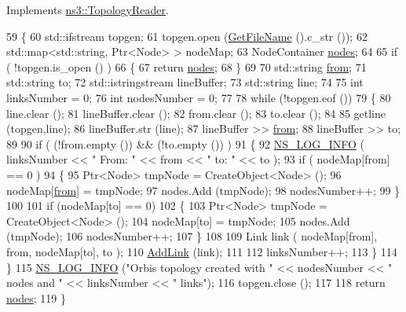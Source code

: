 Implements \hyperlink{classns3_1_1TopologyReader_ae2a69c10e0bb66d6c850a72c6655e69c}{ns3\+::\+Topology\+Reader}.


\begin{DoxyCode}
59 \{
60   std::ifstream topgen;
61   topgen.open (\hyperlink{classns3_1_1TopologyReader_a6d417b0d32aa613887596d769aee6c5d}{GetFileName} ().c\_str ());
62   std::map<std::string, Ptr<Node> > nodeMap;
63   NodeContainer \hyperlink{visualizer-ideas_8txt_a3e1b3808014a2c68ab0cd0182e041be2}{nodes};
64 
65   \textcolor{keywordflow}{if} ( !topgen.is\_open () )
66     \{
67       \textcolor{keywordflow}{return} \hyperlink{visualizer-ideas_8txt_a3e1b3808014a2c68ab0cd0182e041be2}{nodes};
68     \}
69 
70   std::string \hyperlink{lte__amc_8m_a1b4c81ff74eb1a626b5ade44c81004b3}{from};
71   std::string to;
72   std::istringstream lineBuffer;
73   std::string line;
74 
75   \textcolor{keywordtype}{int} linksNumber = 0;
76   \textcolor{keywordtype}{int} nodesNumber = 0;
77 
78   \textcolor{keywordflow}{while} (!topgen.eof ())
79     \{
80       line.clear ();
81       lineBuffer.clear ();
82       from.clear ();
83       to.clear ();
84 
85       getline (topgen,line);
86       lineBuffer.str (line);
87       lineBuffer >> \hyperlink{lte__amc_8m_a1b4c81ff74eb1a626b5ade44c81004b3}{from};
88       lineBuffer >> to;
89 
90       \textcolor{keywordflow}{if} ( (!from.empty ()) && (!to.empty ()) )
91         \{
92           \hyperlink{group__logging_gafbd73ee2cf9f26b319f49086d8e860fb}{NS\_LOG\_INFO} ( linksNumber << \textcolor{stringliteral}{" From: "} << from << \textcolor{stringliteral}{" to: "} << to );
93           \textcolor{keywordflow}{if} ( nodeMap[from] == 0 )
94             \{
95               Ptr<Node> tmpNode = CreateObject<Node> ();
96               nodeMap[\hyperlink{lte__amc_8m_a1b4c81ff74eb1a626b5ade44c81004b3}{from}] = tmpNode;
97               nodes.Add (tmpNode);
98               nodesNumber++;
99             \}
100 
101           \textcolor{keywordflow}{if} (nodeMap[to] == 0)
102             \{
103               Ptr<Node> tmpNode = CreateObject<Node> ();
104               nodeMap[to] = tmpNode;
105               nodes.Add (tmpNode);
106               nodesNumber++;
107             \}
108 
109           Link link ( nodeMap[from], from, nodeMap[to], to );
110           \hyperlink{classns3_1_1TopologyReader_a0ecbd003f3e4c0c142720b20b8cfcbeb}{AddLink} (link);
111 
112           linksNumber++;
113         \}
114     \}
115   \hyperlink{group__logging_gafbd73ee2cf9f26b319f49086d8e860fb}{NS\_LOG\_INFO} (\textcolor{stringliteral}{"Orbis topology created with "} << nodesNumber << \textcolor{stringliteral}{" nodes and "} << linksNumber << \textcolor{stringliteral}{
      " links"});
116   topgen.close ();
117 
118   \textcolor{keywordflow}{return} \hyperlink{visualizer-ideas_8txt_a3e1b3808014a2c68ab0cd0182e041be2}{nodes};
119 \}
\end{DoxyCode}


